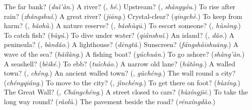 \begin{tcolorbox}[breakable,colback=teal!4,colframe=teal!35!black,title={Before you move on}]
The far bank? (\emph{duì'àn}.) A river? (\textbf{}, \emph{hé}.) Upstream? (\textbf{}, \emph{shàngyóu}.) To rise after rain? (\emph{zhǎngshuǐ}.) A great river? (\emph{jiāng}.) Crystal-clear? (\emph{qīngchè}.) To keep from harm? (\textbf{}, \emph{bǎohù}.) A nature reserve? (\textbf{}, \emph{bǎohùqū}.) To escort someone? (\textbf{}, \emph{hùsòng}.) To catch fish? (\emph{bǔyú}.) To dive under water? (\emph{qiánshuǐ}.) An island? (\textbf{}, \emph{dǎo}.) A peninsula? (\textbf{}, \emph{bàndǎo}.) A lighthouse? (\emph{dēngtǎ}.) Sunscreen? (\emph{fángshàishuāng}.) A wave of the sea? (\emph{hǎilàng}.) A fishing boat? (\emph{yúchuán}.) To go ashore? (\emph{shàng'àn}.) A seashell? (\emph{bèiké}.) To ebb? (\emph{tuìcháo}.) A narrow old lane? (\emph{hútòng}.) A walled town? (\textbf{}, \emph{chéng}.) An ancient walled town? (\textbf{}, \emph{gǔchéng}.) The wall round a city? (\emph{chéngqiáng}.) To move to the city? (\textbf{}, \emph{jìnchéng}.) To get there on foot? (\emph{bùxíng}.) The Great Wall? (\textbf{}, \emph{Chángchéng}.) A street closed to cars? (\emph{bùxíngjiē}.) To take the long way round? (\emph{ràolù}.) The pavement beside the road? (\emph{rénxíngdào}.)
\end{tcolorbox}
